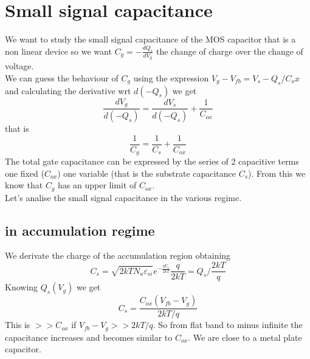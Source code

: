 \section{Small signal capacitance}
We want to study the small signal capacitance of the MOS capacitor that is a non linear device so we want $C_g=-\frac{dQ_s}{dV_g}$ the change of charge over the change of voltage.\\
We can guess the behaviour of $C_g$ using the expression $V_g-V_{fb}=V_s-Q_s/C_ox$ and calculating the derivative wrt $d(-Q_s)$ we get
\begin{equation}
\frac{dV_g}{d(-Q_s)}=\frac{dV_s}{d(-Q_s)}+\frac{1}{C_{ox}}
\end{equation}
that is 
\begin{equation}
\frac{1}{C_g}=\frac{1}{C_s}+\frac{1}{C_{ox}}
\end{equation}
The total gate capacitance can be expressed by the series of 2 capacitive terms one fixed ($C_{ox}$) one variable (that is the substrate capacitance $C_s$). From this we know that $C_g$ has an upper limit of $C_{ox}$.\\
Let's analise the small signal capacitance in the various regime.\\

\subsection{in accumulation regime}
We derivate the charge of the accumulation region obtaining 
\begin{equation}
C_s=\sqrt{2kTN_a\varepsilon_{si}}e^{-\frac{qV_s}{2kT}}\frac{q}{2kT}=Q_s/\frac{2kT}{q}
\end{equation}
Knowing $Q_s(V_g)$ we get 
\begin{equation}
C_s=\frac{C_{ox}(V_{fb}-V_g)}{2kT/q}
\end{equation}
This is $>>C_{ox}$ if $V_{fb}-V_g>>2kT/q$. So from flat band to minus infinite the capacitance increases and becomes similar to $C_{ox}$. We are close to a metal plate capacitor.\\

